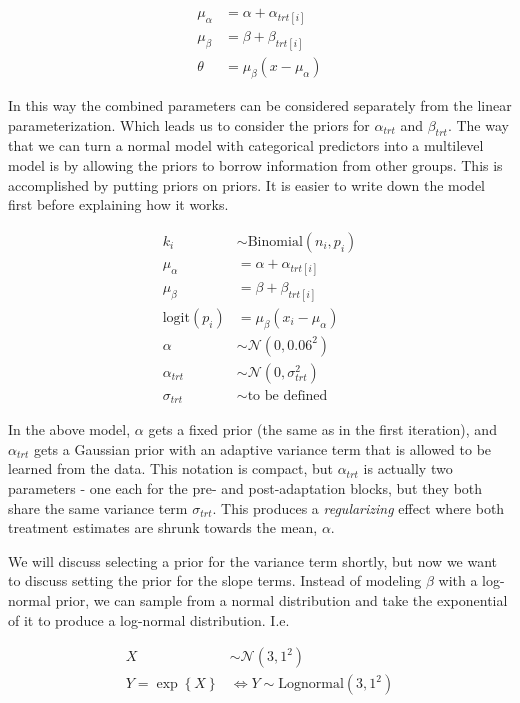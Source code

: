 \documentclass[11pt, oneside, openany]{scrbook}
\begin{document}
\begin{align*}
\mu_\alpha &= \alpha + \alpha_{trt[i]} \\
\mu_\beta &= \beta + \beta_{trt[i]} \\
\theta &= \mu_\beta (x - \mu_\alpha)
\end{align*}

In this way the combined parameters can be considered separately from the linear parameterization. Which leads us to consider the priors for \(\alpha_{trt}\) and \(\beta_{trt}\). The way that we can turn a normal model with categorical predictors into a multilevel model is by allowing the priors to borrow information from other groups. This is accomplished by putting priors on priors. It is easier to write down the model first before explaining how it works.

\begin{align*}
k_i &\sim \mathrm{Binomial}(n_i, p_i) \\
\mu_\alpha &= \alpha + \alpha_{trt[i]} \\
\mu_\beta &= \beta + \beta_{trt[i]} \\
\mathrm{logit}(p_i) &= \mu_\beta (x_i - \mu_\alpha) \\
\alpha &\sim \mathcal{N}(0, 0.06^2) \\
\alpha_{trt} &\sim \mathcal{N}(0, \sigma_{trt}^2) \\
\sigma_{trt} &\sim \textrm{to be defined}
\end{align*}

In the above model, \(\alpha\) gets a fixed prior (the same as in the first iteration), and \(\alpha_{trt}\) gets a Gaussian prior with an adaptive variance term that is allowed to be learned from the data. This notation is compact, but \(\alpha_{trt}\) is actually two parameters - one each for the pre- and post-adaptation blocks, but they both share the same variance term \(\sigma_{trt}\). This produces a \emph{regularizing} effect where both treatment estimates are shrunk towards the mean, \(\alpha\).

We will discuss selecting a prior for the variance term shortly, but now we want to discuss setting the prior for the slope terms. Instead of modeling \(\beta\) with a log-normal prior, we can sample from a normal distribution and take the exponential of it to produce a log-normal distribution. I.e.

\begin{align*}
X &\sim \mathcal{N}(3, 1^2) \\
Y = \exp\left\lbrace X \right\rbrace &\Longleftrightarrow Y \sim \mathrm{Lognormal(3, 1^2)}
\end{align*}
\end{document}
